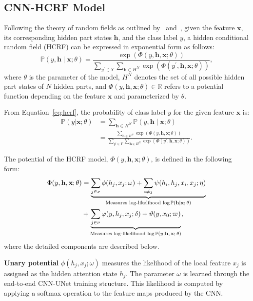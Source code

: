\documentclass[conference]{IEEEtran}
\newcommand{\hb}{\mathbf{h}}
\newcommand{\PP}{{\mathbb{P}}}
\newcommand{\xb}{\mathbf{x}}
\newcommand{\RR}{{\mathbb{R}}}
\begin{document}
\subsection{CNN-HCRF Model}


Following the theory of random fields as outlined
by~\citet{quattoni2004conditional} and~\citet{wang2006hidden},
given the feature $\xb$, its corresponding hidden part states $\hb$,
and the class label $y$, a hidden conditional random field (HCRF) can be
expressed in exponential form as follows:
\begin{equation}
\label{eq:hcrf}
\PP(y, \hb \mid \xb; \theta)
= \frac{\exp\left(\Phi(y, \hb, \xb; \theta)\right)}
{\sum_{y^\prime \in Y} \sum_{\hb \in H^N}
\exp\left(\Phi(y^\prime, \hb, \xb; \theta)\right)},
\end{equation}
where $\theta$ is the parameter of the model,
$H^N$ denotes the set of all possible hidden part states of $N$ hidden parts,
and $\Phi(y, \hb, \xb; \theta) \in \RR$ refers to a potential function
depending on the feature $\xb$ and parameterized by $\theta$.


From Equation~\ref{eq:hcrf}, the probability of class label $y$ for the given
feature $\xb$ is:
\begin{equation*}
\begin{split}
\PP(y \vert \xb; \theta) &= \sum_{\hb \in H^N} \PP(y, \hb \mid \xb; \theta) \\
&= \frac{\sum_{\hb \in H^N} \exp\left(\Phi(y, \hb, \xb; \theta)\right)}
{\sum_{y^\prime \in Y} \sum_{\hb \in H^N}
\exp\left(\Phi(y^\prime, \hb, \xb; \theta)\right)}.
\end{split}
\end{equation*}


The potential of the HCRF model, $\Phi(y, \hb, \xb; \theta)$, is defined in the
following form:
\begin{align*}
\Phi(y, \hb, \xb; \theta) &= \underbrace{
\sum_{j \in \nu} \phi(h_j, x_j; \omega) +
\sum_{i \neq j} \psi(h_i, h_j, x_i, x_j; \eta)}_{
\textrm{Measures log-likelihood $\log \PP(\hb \vert \xb; \theta)$}} \\
& + \underbrace{
\sum_{j \in \nu} \varphi(y, h_j, x_j; \delta) + \vartheta(y, x_0; \varpi)}_{
\textrm{Measures log-likelihood $\log \PP(y \vert \hb, \xb; \theta)$}},
\end{align*}
where the detailed components are described below.


\textbf{Unary potential} $\phi(h_j, x_j; \omega)$ measures the likelihood of
the local feature $x_j$ is assigned as the hidden attention state $h_j$.
The parameter $\omega$ is learned through the end-to-end CNN-UNet training
structure. This likelihood is computed by applying a softmax operation to the
feature maps produced by the CNN.
\end{document}

